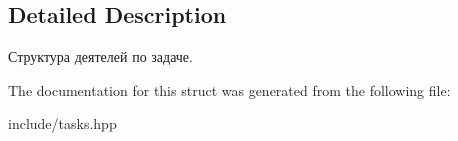 \subsection{Detailed Description}
Структура деятелей по задаче. 

The documentation for this struct was generated from the following file\+:\begin{DoxyCompactItemize}
\item 
include/tasks.\+hpp\end{DoxyCompactItemize}
